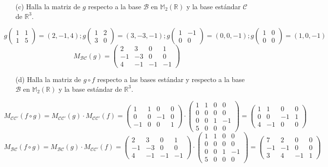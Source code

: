 \documentclass[11pt,a4paper]{article}
\newcommand{\R}{\mathbb R}
\begin{document}
\begin{itemize}\item[(c)] Halla la matriz de $g$ respecto a la base $\mathcal B$ en $\mathbb M_2(\R)$ y la base estándar $\mathcal C$ de $\R^3$.\end{itemize}
\[ g\begin{pmatrix}1&1\\1&5\end{pmatrix}=(2,-1,4); g\begin{pmatrix}1&2\\3&0\end{pmatrix}=(3,-3,-1); g\begin{pmatrix}1&-1\\0&0\end{pmatrix}=(0,0,-1); g\begin{pmatrix}1&0\\0&0\end{pmatrix}=(1,0,-1)
\]
\[
M_{\mathcal{BC}}(g)=\begin{pmatrix}
2&3&0&1\\-1&-3&0&0\\4&-1&-1&-1
\end{pmatrix}
\]
\begin{itemize}\item[(d)] Halla la matriz de $g\circ f$ respecto a las bases estándar y respecto a la base $\mathcal B$ en $\mathbb M_2(\R)$ y la base estándar de $\R^3$.\end{itemize}
\[
M_{\mathcal{CC'}}(f\circ g)=M_{\mathcal{CC'}}(g)\cdot M_{\mathcal{CC'}}(f)=\begin{pmatrix}
1&1&0&0\\0&0&-1&0\\-1&0&0&1
\end{pmatrix}\cdot \begin{pmatrix}
1&1&0&0\\0&0&0&0\\0&0&1&-1\\5&0&0&0
\end{pmatrix}=\begin{pmatrix}
1&1&0&0\\0&0&-1&1\\4&-1&0&0
\end{pmatrix}
\]
\[
M_{\mathcal{BC}}(f\circ g)=M_{\mathcal{BC}}(g)\cdot M_{\mathcal{CC'}}(f)=\begin{pmatrix}
2&3&0&1\\-1&-3&0&0\\4&-1&-1&-1
\end{pmatrix}\cdot \begin{pmatrix}
1&1&0&0\\0&0&0&0\\0&0&1&-1\\5&0&0&0
\end{pmatrix}=\begin{pmatrix}
7&2&0&0\\-1&-1&0&0\\3&4&-1&1
\end{pmatrix}
\]
\end{document}
